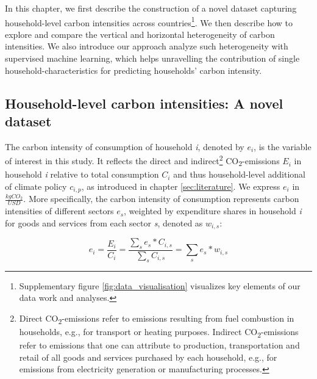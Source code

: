 \documentclass[12pt, a4paper]{article}
\begin{document}
In this chapter, we first describe the construction of a novel dataset capturing household-level carbon intensities across countries\footnote{Supplementary figure \ref{fig:data_visualisation} visualizes key elements of our data work and analyses.}. We then describe how to explore and compare the vertical and horizontal heterogeneity of carbon intensities. We also introduce our approach analyze such heterogeneity with supervised machine learning, which helps unravelling the contribution of single household-characteristics for predicting households' carbon intensity.

\subsection{Household-level carbon intensities: A novel dataset} \label{sec:data}

The carbon intensity of consumption of household \textit{i}, denoted by $e_{i}$, is the variable of interest in this study. It reflects the direct and indirect\footnote{Direct CO\textsubscript{2}-emissions refer to emissions resulting from fuel combustion in households, e.g., for transport or heating purposes. Indirect CO\textsubscript{2}-emissions refer to emissions that one can attribute to production, transportation and retail of all goods and services purchased by each household, e.g., for emissions from electricity generation or manufacturing processes.} CO\textsubscript{2}-emissions $E_{i}$ in household \textit{i} relative to total consumption $C_{i}$ and thus household-level additional of climate policy $c_{i,p}$, as introduced in chapter \ref{sec:literature}. We express $e_{i}$ in $\frac{kgCO_{2}}{USD}$. More specifically, the carbon intensity of consumption represents carbon intensities of different sectors $e_{s}$, weighted by expenditure shares in household \textit{i} for goods and services from each sector \textit{s}, denoted as $w_{i,s}$:


\begin{equation} \label{eq:ei}
e_{i} = \frac{E_{i}}{C_{i}} = \frac{\sum_{s} e_{s}*C_{i,s}}{\sum_{s} C_{i,s}} = \sum_{s} e_{s}*w_{i,s}
\end{equation}

\end{document}
